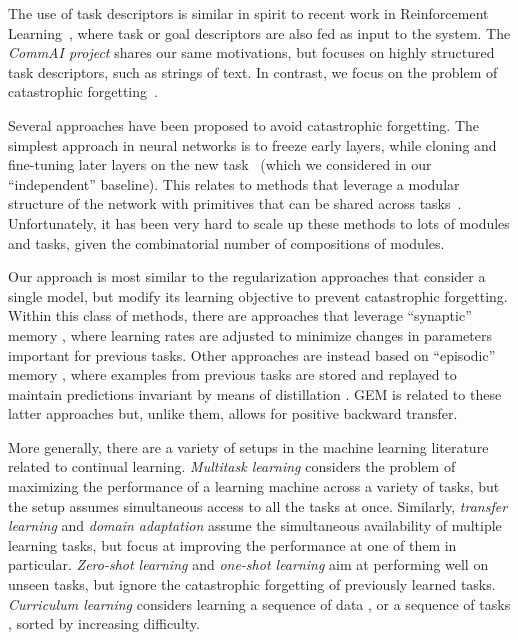 \documentclass{article}
\begin{document}
The use of task descriptors is similar in spirit to recent work in
Reinforcement Learning~\citep{horde, uvfa}, where task or goal descriptors are
also fed as input to the system.  The \emph{CommAI project} \citep{commai,
commai2} shares our same motivations, but focuses on highly structured task
descriptors, such as strings of text. In contrast, we focus on the problem of
catastrophic forgetting~\citep{catastrophic, catastrophic_french,
connectionist, hippocampus, catastrophic_empirical}.

Several approaches have been proposed to avoid catastrophic forgetting.  The
simplest approach in neural networks is to freeze early layers, while cloning
and fine-tuning later layers on the new task~\citep{oquab} (which we considered
in our ``independent'' baseline). This relates to methods that leverage a
modular structure of the network with primitives that can be shared across
tasks~\citep{progressive, pathnet, expert_gate, denoyer15, eigen14}.
Unfortunately, it has been very hard to scale up these methods to lots of
modules and tasks, given the combinatorial number of compositions of modules. 

Our approach is most similar to the regularization approaches that     consider
a single model, but modify its learning objective to prevent catastrophic
forgetting.  Within this class of methods, there are approaches that leverage
``synaptic'' memory \citep{ewc, synaptic}, where learning rates are adjusted to
minimize changes in parameters important for previous tasks.  Other approaches
are instead based on ``episodic'' memory \citep{less_forgetting, lwc,
encoder_lifelong, icarl}, where examples from previous tasks are stored and
replayed to maintain predictions invariant by means of distillation
\citep{distillation}. GEM is related to these latter approaches but, unlike
them, allows for positive backward transfer. 

More generally, there are a variety of setups in the machine learning
literature related to continual learning.  \emph{Multitask learning}
\citep{multitask} considers the problem of maximizing the performance of a
learning machine across a variety of tasks, but the setup assumes simultaneous
access to all the tasks at once. Similarly, \emph{transfer learning}
\citep{transfer_learning} and \emph{domain adaptation}
\citep{domain_adaptation} assume the simultaneous availability of multiple
learning tasks, but focus at improving the performance at one of them in
particular.  \emph{Zero-shot learning} \citep{zero_lampert, zero_palatucci} and
\emph{one-shot learning} \citep{one_shot, matchingnet, santoro16, learnet} aim
at performing well on unseen tasks, but ignore the catastrophic forgetting of
previously learned tasks.  \emph{Curriculum learning} considers learning a
sequence of data \citep{curriculum}, or a sequence of tasks
\citep{curriculum_tasks}, sorted by increasing difficulty. 
\end{document}
